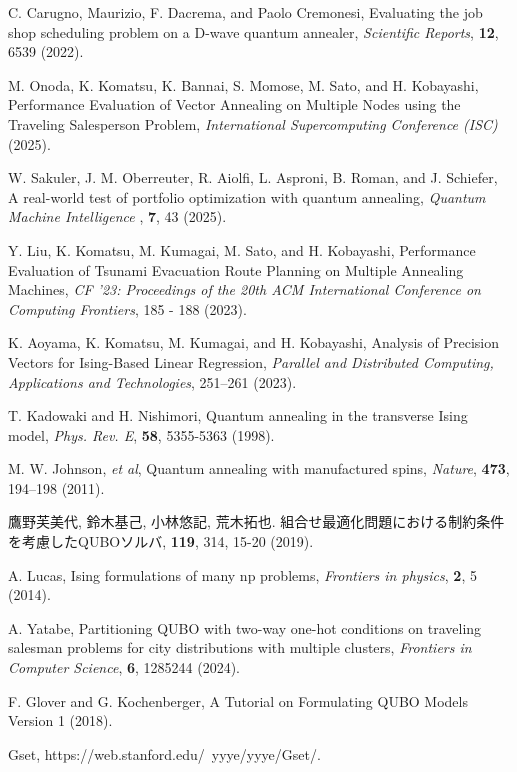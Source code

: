 \documentclass[submit,techrep,noauthor]{ipsj}
\begin{document}
\begin{thebibliography}{10}

C. Carugno, Maurizio, F. Dacrema, and Paolo Cremonesi, Evaluating the job shop scheduling problem on a D-wave quantum annealer, {\it Scientific Reports}, {\bf 12}, 6539 (2022).

M. Onoda, K. Komatsu, K. Bannai, S. Momose, M. Sato, and H. Kobayashi, Performance Evaluation of Vector Annealing  on Multiple Nodes using  the Traveling Salesperson Problem, {\it International Supercomputing Conference (ISC)} (2025).

W. Sakuler, J. M. Oberreuter, R. Aiolfi, L. Asproni, B. Roman, and J. Schiefer, A real-world test of portfolio optimization with quantum annealing, {\it Quantum Machine Intelligence }, {\bf 7}, 43 (2025).

Y. Liu, K. Komatsu, M. Kumagai, M. Sato, and H. Kobayashi, Performance Evaluation of Tsunami Evacuation Route Planning on Multiple Annealing Machines, {\it CF '23: Proceedings of the 20th ACM International Conference on Computing Frontiers}, 185 - 188 (2023).

K. Aoyama, K. Komatsu, M. Kumagai, and H. Kobayashi, Analysis of Precision Vectors for Ising-Based Linear Regression, {\it Parallel and Distributed Computing, Applications and Technologies}, 251–261 (2023).

T. Kadowaki and H. Nishimori, Quantum annealing in the transverse Ising model, {\it Phys. Rev. E}, {\bf 58}, 5355-5363 (1998).

M. W. Johnson, {\it et al}, Quantum annealing with manufactured spins, {\it Nature}, {\bf 473}, 194–198 (2011).

鷹野芙美代, 鈴木基己, 小林悠記, 荒木拓也. 組合せ最適化問題における制約条件を考慮したQUBOソルバ, {\bf 119}, 314, 15-20 (2019).

A. Lucas, Ising formulations of many np problems, {\it Frontiers in physics}, {\bf 2}, 5 (2014).

A. Yatabe, Partitioning QUBO with two-way one-hot conditions on traveling salesman problems for city distributions with multiple clusters, {\it Frontiers in Computer Science}, {\bf 6}, 1285244 (2024).

F. Glover and G. Kochenberger, A Tutorial on Formulating QUBO Models Version 1 (2018).

Gset, https://web.stanford.edu/~yyye/yyye/Gset/.


\end{thebibliography}
\end{document}
